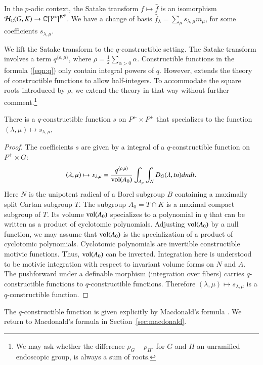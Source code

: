 In the $p$-adic context, the Satake transform $f\mapsto \hat f$
is an isomorphism  $\mathcal H_{\mathbb{C}}(G,K)\to\mathbb{C}[Y^*]^{W^\theta}$.
We have a change of basis $\hat f_\lambda = \sum_\mu s_{\lambda,\mu} m_\mu$, for some coefficients $s_{\lambda,\mu}$.

We lift the Satake transform to the $q$-constructible setting.  The Satake transform involves
a term $q^{\langle\rho,\mu\rangle}$, where $\rho = \frac{1}{2} \sum_{\alpha > 0} \alpha$.   Constructible functions
in the formula (\ref{eqn:q})  only contain integral powers of $q$.  However, \cite[\S B.3.1]{cluckers2011local} 
extends the theory of constructible functions to allow half-integers.  To accommodate the square roots introduced by $\rho$,
we extend
the theory in that way without further comment.\footnote{We may ask whether the difference $\rho_G - \rho_H$,
for $G$ and $H$ an unramified endoscopic group, is always a sum of roots.}

\begin{lemma}\label{lemma:satake} There is a $q$-constructible function $s$ on $P^+\times P^+$ that
specializes to the function $(\lambda,\mu)\mapsto s_{\lambda,\mu}$,
\end{lemma}

\begin{proof} 
The coefficients $s$ are given by a integral of a $q$-constructible function on $P^+\times G$:
\[
(\lambda,\mu)\mapsto s_{\lambda,\mu}=\frac{q^{\langle\rho,\mu\rangle}}{{\operatorname{vol}}(A_0)} \int_{A_\mu} \int_N D_G(\lambda,t n) dn dt.
\]
Here $N$ is the unipotent radical of a Borel subgroup $B$ containing a maximally split Cartan subgroup
$T$.  The subgroup $A_0 = T\cap K$ is a maximal compact subgroup of $T$.  Its volume ${\operatorname{vol}}(A_0)$ specializes
to a polynomial in $q$ that can be written as a product of cyclotomic polynomials.  Adjusting ${\operatorname{vol}}(A_0)$ by a 
null function, we may assume that ${\operatorname{vol}}(A_0)$ is the specialization of a product of cyclotomic polynomials.
Cyclotomic polynomials are invertible constructible motivic functions.  Thus, ${\operatorname{vol}}(A_0)$ can be inverted.
  Integration here is understood to be motivic integration with respect to invariant volume forms on $N$ and $A$.
The pushforward under a definable morphism (integration over fibers) carries $q$-constructible functions
to $q$-constructible functions.
Therefore $(\lambda,\mu)\mapsto s_{\lambda,\mu}$ is a $q$-constructible function.
\end{proof}

The $q$-constructible function is given explicitly by Macdonald's formula \cite{casselman1980unramified}.
We return to Macdonald's formula in Section~\ref{sec:macdonald}.


